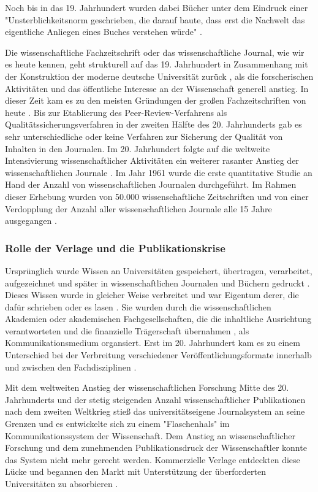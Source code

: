 Noch bis in das 19. Jahrhundert wurden dabei Bücher unter dem Eindruck einer "Unsterblichkeitsnorm geschrieben, die darauf baute, dass erst die Nachwelt das eigentliche Anliegen eines Buches verstehen würde" \cite{hagner_2015_sache_buches}.

Die wissenschaftliche Fachzeitschrift oder das wissenschaftliche Journal, wie wir es heute kennen, geht strukturell auf das 19. Jahrhundert in Zusammenhang mit der Konstruktion der moderne deutsche Universität zurück \cite{Paletschek_2002}, als die forscherischen Aktivitäten und das öffentliche Interesse an der Wissenschaft generell anstieg. In dieser Zeit kam es zu den meisten Gründungen der großen Fachzeitschriften von heute \cite{porter_1964_scientific}. Bis zur Etablierung des Peer-Review-Verfahrens als Qualitätssicherungsverfahren in der zweiten Hälfte des 20. Jahrhunderts gab es sehr unterschiedliche oder keine Verfahren zur Sicherung der Qualität von Inhalten in den Journalen. Im 20. Jahrhundert folgte auf die weltweite Intensivierung wissenschaftlicher Aktivitäten ein weiterer rasanter Anstieg der wissenschaftlichen Journale \cite[:23]{haustein_2012_multidimensional}. Im Jahr 1961 wurde die erste quantitative Studie an Hand der Anzahl von wissenschaftlichen Journalen durchgeführt. Im Rahmen dieser Erhebung wurden von 50.000 wissenschaftliche Zeitschriften und von einer Verdopplung der Anzahl aller wissenschaftlichen Journale alle 15 Jahre ausgegangen \cite{de_1982_little}.

\subsubsection{Rolle der Verlage und die Publikationskrise}

Ursprünglich wurde Wissen an Universitäten gespeichert, übertragen, verarbeitet, aufgezeichnet und später in wissenschaftlichen Journalen und Büchern gedruckt \cite{kittler_2004}. Dieses Wissen wurde in gleicher Weise verbreitet \cite{hagner_2015_sache_buches} und war Eigentum derer, die dafür schrieben oder es lasen \cite{epaa_Weiner_2001}. Sie wurden durch die wissenschaftlichen Akademien oder akademischen Fachgesellschaften, die die inhaltliche Ausrichtung verantworteten und die finanzielle Trägerschaft übernahmen \cite{suchen}, als Kommunikationsmedium organsiert. Erst im 20. Jahrhundert kam es zu einem Unterschied bei der Verbreitung verschiedener Veröffentlichungsformate innerhalb und zwischen den Fachdisziplinen \cite{hagner_2015_sache_buches}.

Mit dem weltweiten Anstieg der wissenschaftlichen Forschung Mitte des 20. Jahrhunderts und der stetig steigenden Anzahl wissenschaftlicher Publikationen nach dem zweiten Weltkrieg stieß das universitätseigene Journalsystem an seine Grenzen und es entwickelte sich zu einem "Flaschenhals" \cite{epaa_Weiner_2001} im Kommunikationssystem der Wissenschaft. Dem Anstieg an wissenschaftlicher Forschung und dem zunehmenden Publikationsdruck der Wissenschaftler konnte das System nicht mehr gerecht werden. Kommerzielle Verlage entdeckten diese Lücke und begannen den Markt mit Unterstützung der überforderten Universitäten zu absorbieren \cite{Hirschi_2015_buch_oa}.


